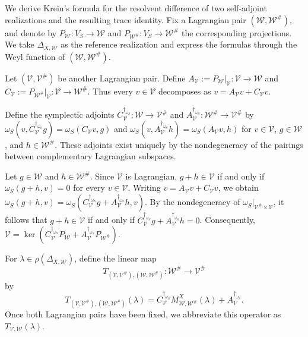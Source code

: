 \documentclass[12pt]{amsart}
\theoremstyle{plain}
\theoremstyle{definition}
\theoremstyle{remark}
\numberwithin{equation}{section} \numberwithin{figure}{section}
\renewcommand*{\to}{\rightarrow}
\begin{document}
We derive Kreĭn's formula for the resolvent difference of two
self-adjoint realizations and the resulting trace identity. Fix a
Lagrangian pair
\((\mathcal W,\mathcal W^\#)\), and denote by
\(P_{\mathcal W}:V_S\to\mathcal W\) and
\(P_{\mathcal W^\#}:V_S\to\mathcal W^\#\) the corresponding
projections. We take \(\Delta_{X,\mathcal W}\) as the reference
realization and express the formulas through the Weyl function of
\((\mathcal W,\mathcal W^\#)\).

Let \((\mathcal V,\mathcal V^\#)\) be another Lagrangian pair.
Define
\(A_{\mathcal V}
:=P_{\mathcal W}|_{\mathcal V}:
\mathcal V\to\mathcal W\)
and
\(C_{\mathcal V}
:=P_{\mathcal W^\#}|_{\mathcal V}:
\mathcal V\to\mathcal W^\#\).
Thus every \(v\in\mathcal V\) decomposes as
\(v=A_{\mathcal V}v+C_{\mathcal V}v\).

Define the symplectic adjoints
\(C_{\mathcal V}^{\dagger_{\omega_S}}:
\mathcal W\to\mathcal V^\#\)
and
\(A_{\mathcal V}^{\dagger_{\omega_S}}:
\mathcal W^\#\to\mathcal V^\#\)
by
\(\omega_S(v,C_{\mathcal V}^{\dagger_{\omega_S}}g)
=\omega_S(C_{\mathcal V}v,g)\)
and
\(\omega_S(v,A_{\mathcal V}^{\dagger_{\omega_S}}h)
=\omega_S(A_{\mathcal V}v,h)\)
for \(v\in\mathcal V\), \(g\in\mathcal W\), and
\(h\in\mathcal W^\#\). These adjoints exist uniquely by the
nondegeneracy of the pairings between complementary Lagrangian
subspaces.

Let \(g\in\mathcal W\) and \(h\in\mathcal W^\#\). Since
\(\mathcal V\) is Lagrangian, \(g+h\in\mathcal V\) if and only if
\(\omega_S(g+h,v)=0\) for every \(v\in\mathcal V\). Writing
\(v=A_{\mathcal V}v+C_{\mathcal V}v\), we obtain
\(
\omega_S(g+h,v)
=
\omega_S(
C_{\mathcal V}^{\dagger_{\omega_S}}g
+
A_{\mathcal V}^{\dagger_{\omega_S}}h,
v).
\)
By the nondegeneracy of
\(\omega_S|_{\mathcal V^\#\times\mathcal V}\), it follows that
\(g+h\in\mathcal V\) if and only if
\(C_{\mathcal V}^{\dagger_{\omega_S}}g
+A_{\mathcal V}^{\dagger_{\omega_S}}h=0\). Consequently,
\(
\mathcal V
=
\ker(
C_{\mathcal V}^{\dagger_{\omega_S}}P_{\mathcal W}
+
A_{\mathcal V}^{\dagger_{\omega_S}}P_{\mathcal W^\#}).
\)

For \(\lambda\in\rho(\Delta_{X,\mathcal W})\), define the linear map
\[
T_{(\mathcal V,\mathcal V^\#),(\mathcal W,\mathcal W^\#)}
:\mathcal W^\#\longrightarrow\mathcal V^\#
\]
by
\[
T_{(\mathcal V,\mathcal V^\#),(\mathcal W,\mathcal W^\#)}(\lambda)
=
C_{\mathcal V}^{\dagger_{\omega_S}}
M_{\mathcal W,\mathcal W^\#}^{X}(\lambda)
+
A_{\mathcal V}^{\dagger_{\omega_S}}.
\]
Once both Lagrangian pairs have been fixed, we abbreviate this
operator as \(T_{\mathcal V,\mathcal W}(\lambda)\).
\end{document}
